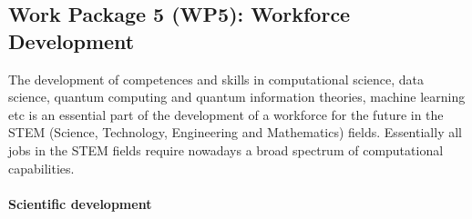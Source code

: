 \documentclass[10pt]{article}
\begin{document}
\subsection{Work Package 5 (WP5): Workforce Development}

The development of competences and skills in computational science, data science, quantum computing and quantum information theories, machine learning etc is an essential part of the development of a workforce for the future in the STEM (Science, Technology, Engineering and Mathematics) fields. Essentially all jobs in the STEM fields require nowadays a broad spectrum of computational capabilities. 

\paragraph{Scientific development}
\end{document}
